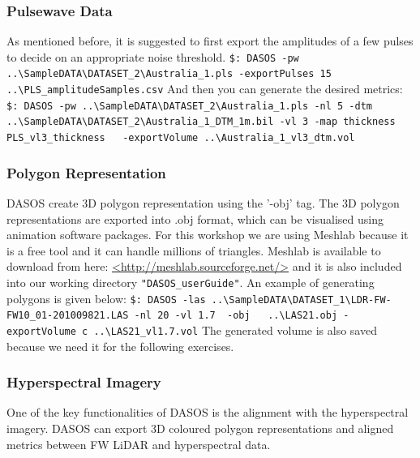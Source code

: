 \documentclass{article}
\begin{document}
		\subsubsection{Pulsewave Data}
		As mentioned before, it is suggested to first export the amplitudes of a few pulses to decide on an appropriate noise threshold.\newline
		\verb|$: DASOS -pw ..\SampleDATA\DATASET_2\Australia_1.pls -exportPulses 15 |\newline \verb|   ..\PLS_amplitudeSamples.csv|
		\newline\newline
		And then you can generate the desired metrics:\newline
		\verb|$: DASOS -pw ..\SampleDATA\DATASET_2\Australia_1.pls -nl 5 -dtm |\newline \verb|   ..\SampleDATA\DATASET_2\Australia_1_DTM_1m.bil -vl 3 -map thickness |\newline \verb| PLS_vl3_thickness   -exportVolume ..\Australia_1_vl3_dtm.vol|\newline
		
		\subsubsection{Polygon Representation}
		DASOS create 3D polygon representation using the '-obj' tag. The 3D polygon representations are exported into .obj format, which can be visualised using animation software packages. For this workshop we are using Meshlab because it is a free tool and it can handle millions of triangles.\newline
		Meshlab is available to download from here: \url{<http://meshlab.sourceforge.net/>} and it is also included into our working directory \verb|"DASOS_userGuide"|.\newline
		An example of generating polygons is given below:\newline
		\verb|$: DASOS -las ..\SampleDATA\DATASET_1\LDR-FW-FW10_01-201009821.LAS -nl 20 -vl 1.7 |\newline \verb| -obj   ..\LAS21.obj -exportVolume c ..\LAS21_vl1.7.vol|\newline
		The generated volume is also saved because we need it for the following exercises. 
		
		
	    \subsubsection{Hyperspectral Imagery}
	    \par One of the key functionalities of DASOS is the alignment with the hyperspectral imagery. DASOS can export 3D coloured polygon representations and aligned metrics between FW LiDAR and hyperspectral data. 
	    
\end{document}
